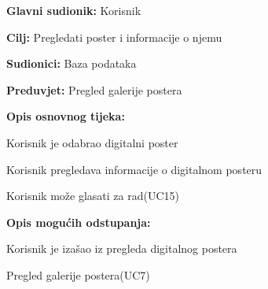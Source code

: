 					\noindent {}
					\begin{packed_item}
						
						\item \textbf{Glavni sudionik: }Korisnik
						\item  \textbf{Cilj:} Pregledati poster i informacije o njemu
						\item  \textbf{Sudionici:} Baza podataka
						\item  \textbf{Preduvjet:} Pregled galerije postera
						\item  \textbf{Opis osnovnog tijeka:}
						
						\item[] \begin{packed_enum}
							
							\item Korisnik je odabrao digitalni poster
							\item Korisnik pregledava informacije o digitalnom posteru
							\item Korisnik može glasati za rad(UC15)
						\end{packed_enum}
						
						\item  \textbf{Opis mogućih odstupanja:}
						
						\item[] \begin{packed_item}
							
							\item[2.a] Korisnik je izašao iz pregleda digitalnog postera
							\item[] \begin{packed_enum}
								
								\item Pregled galerije postera(UC7)
								
							\end{packed_enum}
							
						\end{packed_item}
					\end{packed_item}
					
